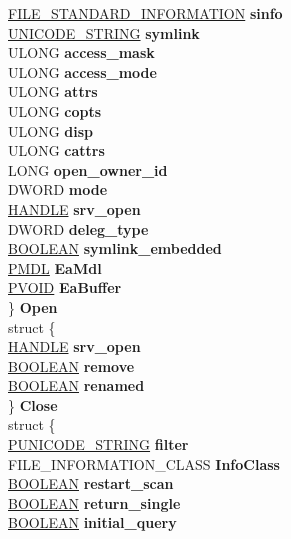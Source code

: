 \begin{DoxyCompactItemize}
\begin{tabbing}
\>\>\hyperlink{struct___f_i_l_e___s_t_a_n_d_a_r_d___i_n_f_o_r_m_a_t_i_o_n}{FILE\_STANDARD\_INFORMATION} {\bfseries sinfo}\\
\>\>\hyperlink{struct___u_n_i_c_o_d_e___s_t_r_i_n_g}{UNICODE\_STRING} {\bfseries symlink}\\
\>\>ULONG {\bfseries access\_mask}\\
\>\>ULONG {\bfseries access\_mode}\\
\>\>ULONG {\bfseries attrs}\\
\>\>ULONG {\bfseries copts}\\
\>\>ULONG {\bfseries disp}\\
\>\>ULONG {\bfseries cattrs}\\
\>\>LONG {\bfseries open\_owner\_id}\\
\>\>DWORD {\bfseries mode}\\
\>\>\hyperlink{interfacevoid}{HANDLE} {\bfseries srv\_open}\\
\>\>DWORD {\bfseries deleg\_type}\\
\>\>\hyperlink{_processor_bind_8h_a112e3146cb38b6ee95e64d85842e380a}{BOOLEAN} {\bfseries symlink\_embedded}\\
\>\>\hyperlink{interfacevoid}{PMDL} {\bfseries EaMdl}\\
\>\>\hyperlink{interfacevoid}{PVOID} {\bfseries EaBuffer}\\
\>\} {\bfseries Open}\\
\>struct \{\\
\>\>\hyperlink{interfacevoid}{HANDLE} {\bfseries srv\_open}\\
\>\>\hyperlink{_processor_bind_8h_a112e3146cb38b6ee95e64d85842e380a}{BOOLEAN} {\bfseries remove}\\
\>\>\hyperlink{_processor_bind_8h_a112e3146cb38b6ee95e64d85842e380a}{BOOLEAN} {\bfseries renamed}\\
\>\} {\bfseries Close}\\
\>struct \{\\
\>\>\hyperlink{struct___u_n_i_c_o_d_e___s_t_r_i_n_g}{PUNICODE\_STRING} {\bfseries filter}\\
\>\>FILE\_INFORMATION\_CLASS {\bfseries InfoClass}\\
\>\>\hyperlink{_processor_bind_8h_a112e3146cb38b6ee95e64d85842e380a}{BOOLEAN} {\bfseries restart\_scan}\\
\>\>\hyperlink{_processor_bind_8h_a112e3146cb38b6ee95e64d85842e380a}{BOOLEAN} {\bfseries return\_single}\\
\>\>\hyperlink{_processor_bind_8h_a112e3146cb38b6ee95e64d85842e380a}{BOOLEAN} {\bfseries initial\_query}\\

\end{tabbing}
\end{DoxyCompactItemize}
